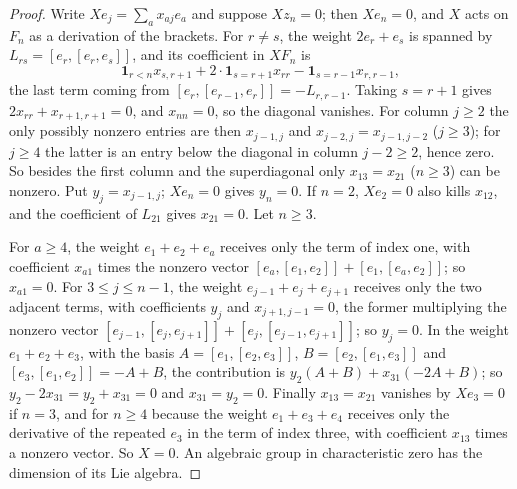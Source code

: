 \documentclass[11pt,a4paper]{article}
\theoremstyle{definition}
\begin{document}
\begin{proof}
Write $Xe_j=\sum_ax_{aj}e_a$ and suppose $Xz_n=0$; then $Xe_n=0$, and $X$ acts
on $F_n$ as a derivation of the brackets. For $r\ne s$, the weight $2e_r+e_s$
is spanned by $L_{rs}=[e_r,[e_r,e_s]]$, and its coefficient in $XF_n$ is
\[
 \mathbf1_{r<n}x_{s,r+1}+2\cdot\mathbf1_{s=r+1}x_{rr}-\mathbf1_{s=r-1}x_{r,r-1},
\]
the last term coming from $[e_r,[e_{r-1},e_r]]=-L_{r,r-1}$. Taking $s=r+1$ gives
$2x_{rr}+x_{r+1,r+1}=0$, and $x_{nn}=0$, so the diagonal vanishes. For column
$j\ge2$ the only possibly nonzero entries are then $x_{j-1,j}$ and
$x_{j-2,j}=x_{j-1,j-2}$ ($j\ge3$); for $j\ge4$ the latter is an entry below the
diagonal in column $j-2\ge2$, hence zero. So besides the first column and the
superdiagonal only $x_{13}=x_{21}$ ($n\ge3$) can be nonzero. Put
$y_j=x_{j-1,j}$; $Xe_n=0$ gives $y_n=0$. If $n=2$, $Xe_2=0$ also kills $x_{12}$,
and the coefficient of $L_{21}$ gives $x_{21}=0$. Let $n\ge3$.

For $a\ge4$, the weight $e_1+e_2+e_a$ receives only the term of index one,
with coefficient $x_{a1}$ times the nonzero vector
$[e_a,[e_1,e_2]]+[e_1,[e_a,e_2]]$; so $x_{a1}=0$. For $3\le j\le n-1$, the
weight $e_{j-1}+e_j+e_{j+1}$ receives only the two adjacent terms, with
coefficients $y_j$ and $x_{j+1,j-1}=0$, the former multiplying the nonzero
vector $[e_{j-1},[e_j,e_{j+1}]]+[e_j,[e_{j-1},e_{j+1}]]$; so $y_j=0$. In the
weight $e_1+e_2+e_3$, with the basis $A=[e_1,[e_2,e_3]]$,
$B=[e_2,[e_1,e_3]]$ and $[e_3,[e_1,e_2]]=-A+B$, the contribution is
$y_2(A+B)+x_{31}(-2A+B)$; so $y_2-2x_{31}=y_2+x_{31}=0$ and
$x_{31}=y_2=0$. Finally $x_{13}=x_{21}$ vanishes by $Xe_3=0$ if $n=3$, and for
$n\ge4$ because the weight $e_1+e_3+e_4$ receives only the derivative of the
repeated $e_3$ in the term of index three, with coefficient $x_{13}$ times a
nonzero vector. So $X=0$. An algebraic group in characteristic zero has the
dimension of its Lie algebra.
\end{proof}
\end{document}
